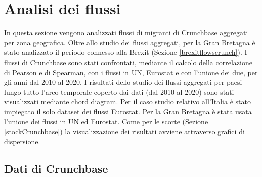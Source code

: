 \section{Analisi dei flussi}
\label{sec:analisi_flussi}
In questa sezione vengono analizzati flussi di migranti di Crunchbase aggregati per zona geografica.
Oltre allo studio dei flussi aggregati, per la Gran Bretagna è stato analizzato il periodo connesso alla Brexit (Sezione \ref{brexitflowscrunch}).
I flussi di Crunchbase sono stati confrontati, mediante il calcolo della correlazione di Pearson e di Spearman, con i flussi in UN, Eurostat e con l'unione dei due, per gli anni dal 2010 al 2020.
I risultati dello studio dei flussi aggregati per paesi lungo tutto l'arco temporale coperto dai dati (dal 2010 al 2020) sono stati visualizzati mediante chord diagram.
Per il caso studio relativo all'Italia è stato impiegato il solo dataset dei flussi Eurostat. Per la Gran Bretagna è stata usata l'unione dei flussi in UN ed Eurostat. 
Come per le scorte (Sezione \ref{stockCrunchbase}) la visualizzazione dei risultati avviene attraverso grafici di dispersione.
\FloatBarrier
\subsection{Dati di Crunchbase} 
\label{flowscrunch}

